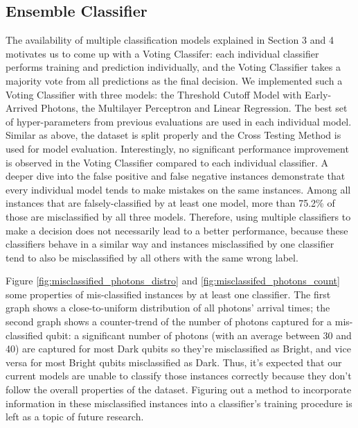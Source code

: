 \documentclass[letterpaper,twocolumn,10pt]{article}
\begin{document}
\subsection{Ensemble Classifier}

The availability of multiple classification models explained in Section 3 and 4 motivates us to come up with a Voting Classifer: each individual classifier performs training and prediction individually, and the Voting Classifier takes a majority vote from all predictions as the final decision. We implemented such a Voting Classifier with three models: the Threshold Cutoff Model with Early-Arrived Photons, the Multilayer Perceptron and Linear Regression. The best set of hyper-parameters from previous evaluations are used in each individual model. Similar as above, the dataset is split properly and the Cross Testing Method is used for model evaluation. Interestingly, no significant performance improvement is observed in the Voting Classifier compared to each individual classifier. A deeper dive into the false positive and false negative instances demonstrate that every individual model tends to make mistakes on the same instances. Among all instances that are falsely-classified by at least one model, more than 75.2\% of those are misclassified by all three models. Therefore, using multiple classifiers to make a decision does not necessarily lead to a better performance, because these classifiers behave in a similar way and instances misclassified by one classifier tend to also be misclassified by all others with the same wrong label.

Figure \ref{fig:misclassified_photons_distro} and \ref{fig:misclassifed_photons_count} some properties of mis-classified instances by at least one classifier. The first graph shows a close-to-uniform distribution of all photons' arrival times; the second graph shows a counter-trend of the number of photons captured for a mis-classified qubit: a significant number of photons (with an average between 30 and 40) are captured for most Dark qubits so they're misclassified as Bright, and vice versa for most Bright qubits misclassified as Dark. Thus, it's expected that our current models are unable to classify those instances correctly because they don't follow the overall properties of the dataset. Figuring out a method to incorporate information in these misclassified instances into a classifier's training procedure is left as a topic of future research.
\end{document}
